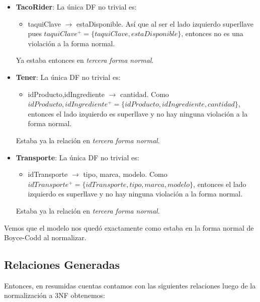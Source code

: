 \documentclass[11pt,letterpaper]{article}
\begin{document}
\begin{itemize}
\item \textbf{TacoRider}: La única DF no trivial es:

\begin{itemize}
\item taquiClave $\rightarrow$ estaDisponible. Así que al ser el lado izquierdo superllave pues $taquiClave^+=\{taquiClave,estaDisponible\}$, entonces no es una violación a la forma normal.
\end{itemize}

Ya estaba entonces en \textit{tercera forma normal}. 

\item \textbf{Tener}: La única DF no trivial es:

\begin{itemize}
\item idProducto,idIngrediente $\rightarrow$ cantidad. Como $idProducto,idIngrediente^+=\{idProducto,idIngrediente,cantidad\}$, entonces el lado izquierdo es superllave y no hay ninguna violación a la forma normal.
\end{itemize}

Estaba ya la relación en \textit{tercera forma normal}.

\item \textbf{Transporte}: La única DF no trivial es:

\begin{itemize}
\item idTransporte $\rightarrow$ tipo, marca, modelo. Como $idTransporte^+=\{idTransporte,tipo, marca, modelo\}$, entonces el lado izquierdo es superllave y no hay ninguna violación a la forma normal.
\end{itemize}

Estaba ya la relación en \textit{tercera forma normal}.

\end{itemize}

Vemos que el modelo nos quedó exactamente como estaba en la forma normal de Boyce-Codd al normalizar.

\subsection{Relaciones Generadas}
Entonces, en resumidas cuentas contamos con las siguientes relaciones luego de la normalización a 3NF obtenemos:
\end{document}
